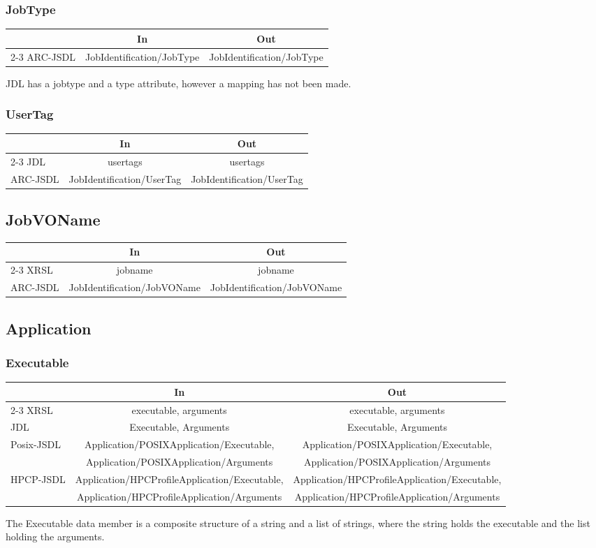 \documentclass{article}
\newenvironment{inouttabular}%
{\begin{center}\begin{tabular}{l>{\ttfamily\footnotesize}c>{\ttfamily\footnotesize}c}%
\toprule
& \textnormal{\normalsize{In}} & \textnormal{\normalsize{Out}}\\ \cmidrule{2-3}}
{\bottomrule\end{tabular}\end{center}}
\begin{document}
\subsubsection{JobType}
\begin{inouttabular}
ARC-JSDL & JobIdentification/JobType & JobIdentification/JobType\\
\end{inouttabular}
JDL has a jobtype and a type attribute, however a mapping has not been
made.

\subsubsection{UserTag}
\begin{inouttabular}
JDL & usertags & usertags\\
ARC-JSDL & JobIdentification/UserTag & JobIdentification/UserTag\\
\end{inouttabular}

\subsection{JobVOName}
\begin{inouttabular}
XRSL & jobname & jobname\\
ARC-JSDL & JobIdentification/JobVOName & JobIdentification/JobVOName\\
\end{inouttabular}

\subsection{Application}
\subsubsection{Executable}
\begin{inouttabular}
XRSL & executable, arguments & executable, arguments\\
JDL & Executable, Arguments & Executable, Arguments\\
\multirow{2}{*}{Posix-JSDL} & Application/POSIXApplication/Executable, & Application/POSIXApplication/Executable,\\
&  Application/POSIXApplication/Arguments & Application/POSIXApplication/Arguments\\
\multirow{2}{*}{HPCP-JSDL} & Application/HPCProfileApplication/Executable, & Application/HPCProfileApplication/Executable,\\
&  Application/HPCProfileApplication/Arguments & Application/HPCProfileApplication/Arguments\\
\end{inouttabular}
The Executable data member is a composite structure of a string and a
list of strings, where the string holds the executable and the list
holding the arguments.
\end{document}

